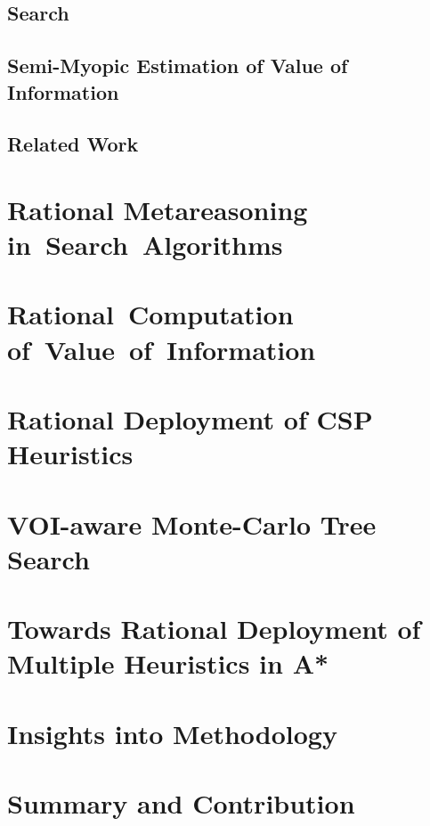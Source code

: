 \documentclass[oneside]{report}
\begin{document}
\section{Search}
\label{sec:search}


\section{Semi-Myopic Estimation of Value of Information}
\label{sec:blinkered}


\section{Related Work}
\label{sec:related}


\chapter{Rational Metareasoning in~Search~Algorithms}
\label{ch:ramesrch}


\chapter{Rational~Computation of~Value~of~Information}
\label{ch:raticomp}


\chapter{Rational Deployment of CSP Heuristics}
\label{ch:cs-csp}


\chapter{VOI-aware Monte-Carlo Tree Search}
\label{ch:cs-mcts}


\chapter{Towards Rational Deployment of Multiple Heuristics in A*}
\label{ch:cs-rla}


\chapter{Insights into Methodology}
\label{ch:insights}


\chapter {Summary and Contribution}
\label{ch:summary}




\end{document}
